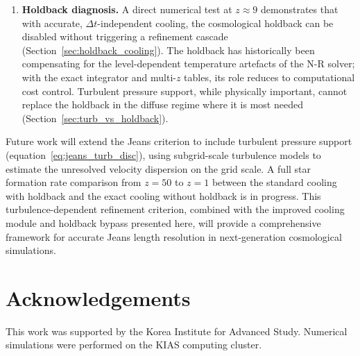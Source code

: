 \documentclass[fleqn,usenatbib]{mnras}
\begin{document}
\begin{enumerate}
  \item \textbf{Holdback diagnosis.}  A direct numerical test at
    $z \approx 9$ demonstrates that with accurate,
    $\Delta t$-independent cooling, the cosmological holdback can be
    disabled without triggering a refinement cascade
    (Section~\ref{sec:holdback_cooling}).  The holdback has
    historically been compensating for the level-dependent temperature
    artefacts of the N-R solver; with the exact integrator and
    multi-$z$ tables, its role reduces to computational cost control.
    Turbulent pressure support, while physically important, cannot
    replace the holdback in the diffuse regime where it is most needed
    (Section~\ref{sec:turb_vs_holdback}).
\end{enumerate}

Future work will extend the Jeans criterion to include turbulent
pressure support (equation~\ref{eq:jeans_turb_disc}), using
subgrid-scale turbulence models to estimate the unresolved velocity
dispersion on the grid scale.  A full star formation rate comparison
from $z = 50$ to $z = 1$ between the standard cooling with holdback
and the exact cooling without holdback is in progress.  This
turbulence-dependent refinement criterion, combined with the
improved cooling module and holdback bypass presented here, will
provide a comprehensive framework for accurate Jeans length
resolution in next-generation cosmological simulations.


\section*{Acknowledgements}

This work was supported by the Korea Institute for Advanced Study.
Numerical simulations were performed on the KIAS computing cluster.
\end{document}
